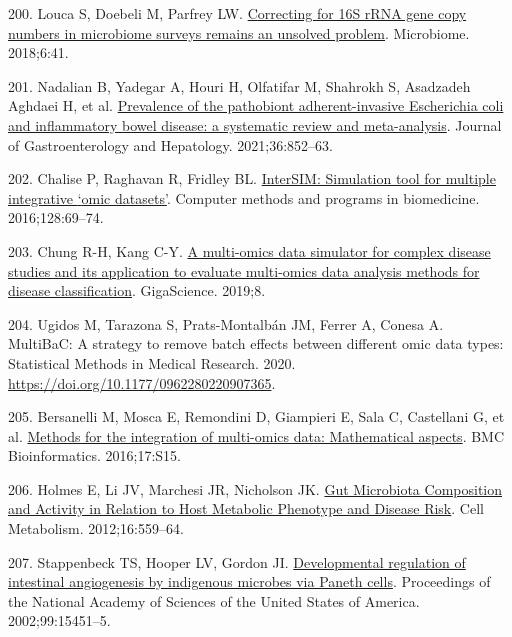 \documentclass[
  12pt,
  a4paper,
  twoside,
  openright]{book}
\newlength{\cslhangindent}
\newlength{\cslentryspacingunit} %
\newenvironment{CSLReferences}[2] %
 {%
  \setlength{\parindent}{0pt}
  \ifodd #1
  \let\oldpar\par
  \def\par{\hangindent=\cslhangindent\oldpar}
  \fi
  \setlength{\parskip}{#2\cslentryspacingunit}
 }%
 {}
\begin{document}
\begin{CSLReferences}{0}{0}
\leavevmode{}%
200. Louca S, Doebeli M, Parfrey LW. \href{https://doi.org/10.1186/s40168-018-0420-9}{Correcting for 16S rRNA gene copy numbers in microbiome surveys remains an unsolved problem}. Microbiome. 2018;6:41.

\leavevmode{}%
201. Nadalian B, Yadegar A, Houri H, Olfatifar M, Shahrokh S, Asadzadeh Aghdaei H, et al. \href{https://doi.org/10.1111/jgh.15260}{Prevalence of the pathobiont adherent-invasive Escherichia coli and inflammatory bowel disease: a systematic review and meta-analysis}. Journal of Gastroenterology and Hepatology. 2021;36:852--63.

\leavevmode{}%
202. Chalise P, Raghavan R, Fridley BL. \href{https://doi.org/10.1016/j.cmpb.2016.02.011}{InterSIM: Simulation tool for multiple integrative {`}omic datasets{'}}. Computer methods and programs in biomedicine. 2016;128:69--74.

\leavevmode{}%
203. Chung R-H, Kang C-Y. \href{https://doi.org/10.1093/gigascience/giz045}{A multi-omics data simulator for complex disease studies and its application to evaluate multi-omics data analysis methods for disease classification}. GigaScience. 2019;8.

\leavevmode{}%
204. Ugidos M, Tarazona S, Prats-Montalbán JM, Ferrer A, Conesa A. MultiBaC: A strategy to remove batch effects between different omic data types: Statistical Methods in Medical Research. 2020. \url{https://doi.org/10.1177/0962280220907365}.

\leavevmode{}%
205. Bersanelli M, Mosca E, Remondini D, Giampieri E, Sala C, Castellani G, et al. \href{https://doi.org/10.1186/s12859-015-0857-9}{Methods for the integration of multi-omics data: Mathematical aspects}. BMC Bioinformatics. 2016;17:S15.

\leavevmode{}%
206. Holmes E, Li JV, Marchesi JR, Nicholson JK. \href{https://doi.org/10.1016/j.cmet.2012.10.007}{Gut Microbiota Composition and Activity in Relation to Host Metabolic Phenotype and Disease Risk}. Cell Metabolism. 2012;16:559--64.

\leavevmode{}%
207. Stappenbeck TS, Hooper LV, Gordon JI. \href{https://doi.org/10.1073/pnas.202604299}{Developmental regulation of intestinal angiogenesis by indigenous microbes via Paneth cells}. Proceedings of the National Academy of Sciences of the United States of America. 2002;99:15451--5.


\end{CSLReferences}
\end{document}
